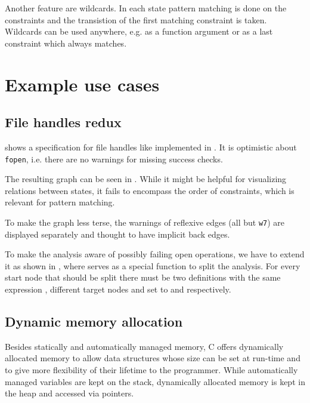 Another feature are wildcards. In each state pattern matching is done on the constraints and the transistion of the first matching constraint is taken. Wildcards can be used anywhere, e.g. as a function argument or as a last constraint which always matches.



\chapter{Example use cases}

\section{File handles redux}
 shows a specification for file handles like implemented in . It is optimistic about \verb|fopen|, i.e. there are no warnings for missing success checks.

The resulting graph can be seen in . While it might be helpful for visualizing relations between states, it fails to encompass the order of constraints, which is relevant for pattern matching.

To make the graph less terse, the warnings of reflexive edges (all but \verb|w7|) are displayed separately and thought to have implicit back edges.

\begin{landscape}
\end{landscape}

To make the analysis aware of possibly failing open operations, we have to extend it as shown in , where  serves as a special function to split the analysis.
For every start node that should be split there must be two definitions with the same expression , different target nodes and  set to  and  respectively.


\section{Dynamic memory allocation}
Besides statically and automatically managed memory, C offers dynamically allocated memory to allow data structures whose size can be set at run-time and to give more flexibility of their lifetime to the programmer. While automatically managed variables are kept on the stack, dynamically allocated memory is kept in the heap and accessed via pointers.

